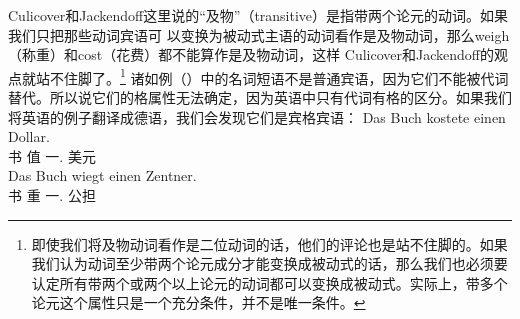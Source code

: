 Culicover和Jackendoff这里说的“及物”（transitive）是指带两个论元的动词。如果我们只把那些动词宾语可
以变换为被动式主语的动词看作是及物动词，那么weigh（称重）和cost（花费）都不能算作是及物动词，这样
Culicover和Jackendoff的观点就站不住脚了。\footnote{%
即使我们将及物动词看作是二位动词的话，他们的评论也是站不住脚的。如果我们认为动词至少带两个论元成分才能变换成被动式的话，那么我们也必须要认定所有带两个或两个以上论元的动词都可以变换成被动式。实际上，带多个论元这个属性只是一个充分条件，并不是唯一条件。}
诸如例（）中的名词短语不是普通宾语，因为它们不能被代词替代。所以说它们的格属性无法确定，因为英语中只有代词有格的区分。如果我们将英语的例子翻译成德语，我们会发现它们是宾格宾语：
\eal
\ex 
\gll Das Buch kostete einen Dollar.\\
        书 值 一.\acc{} 美元\\
\ex 
\gll Das Buch wiegt einen Zentner.\\
      书 重 一.\acc{} 公担\\
\zl


